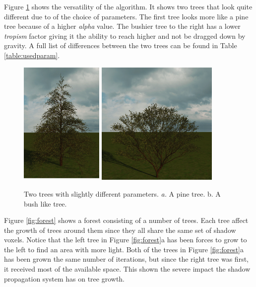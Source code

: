 \documentclass{article}
\begin{document}
  		Figure \ref{fig:pinebush} shows the versatility of the algorithm. It shows two trees that look quite different due to of the choice of parameters. The first tree looks more like a pine tree because of a higher \textit{alpha } value. The bushier tree to the right has a lower \textit{tropism} factor giving it the ability to reach higher and not be dragged down by gravity. A full list of differences between the two trees can be found in Table \ref{table:usedparam}. \\
  	
  		\begin{figure}[h!]
  			\centering
 			\includegraphics[height=6cm]{pine} 
 			\includegraphics[height=6cm]{bush}
 			
  			\caption{Two trees with slightly different parameters. \textit{a.} A pine tree. b. A bush like tree.}
  			\label{fig:pinebush}
  		\end{figure}
  	
  		Figure \ref{fig:forest} shows a forest consisting of a number of trees. Each tree affect the growth of trees around them since they all share the same set of shadow voxels. Notice that the left tree in Figure \ref{fig:forest}a has been forces to grow to the left to find an area with more light. Both of the trees in Figure \ref{fig:forest}a has been grown the same number of iterations, but since the right tree was first, it received most of the available space. This shown the severe impact the shadow propagation system has on tree growth. \\
  	
\end{document}
